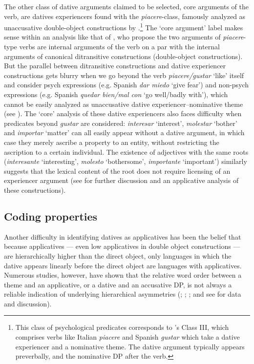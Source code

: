 \documentclass[output=paper,colorlinks,citecolor=brown,modfonts,nonflat]{langsci/langscibook}
\begin{document}
The other class of dative arguments claimed to be selected, core arguments of the verb, are datives experiencers found with the \textit{piacere}-class, famously analyzed as unaccusative double-object constructions by \citealt{BellettiRizzi1988}.\footnote{This class of psychological predicates corresponds to \citeauthor{BellettiRizzi1988}’s Class III, which comprises verbs like Italian \textit{piacere} and Spanish \textit{gustar} which take a dative experiencer and a nominative theme. The dative argument typically appears preverbally, and the nominative DP after the verb.}  The ‘core argument’ label makes sense within an analysis like that of \citeauthor{BellettiRizzi1988}, who propose the two arguments of \textit{piacere}-type verbs are internal arguments of the verb on a par with the internal arguments of canonical ditransitive constructions (double-object constructions).  But the parallel between ditransitive constructions and dative experiencer constructions gets blurry when we go beyond the verb \textit{piacere/gustar} ‘like’ itself and consider psych expressions (e.g. Spanish \textit{dar miedo} ‘give fear’) and non-psych expressions (e.g. Spanish \textit{quedar bien/mal con} ‘go well/badly with’), which cannot be easily analyzed as unaccusative dative experiencer–nominative theme (see \citealt{Cuervo2011}). The ‘core’ analysis of these dative experiencers also faces difficulty when predicates beyond \textit{gustar} are considered: \textit{interesar} ‘interest’, \textit{molestar} ‘bother’ and \textit{importar} ‘matter’ can all easily appear without a dative argument, in which case they merely ascribe a property to an entity, without restricting the ascription to a certain individual. The existence of adjectives with the same roots (\textit{interesante} ‘interesting’, \textit{molesto} ‘bothersome’, \textit{importante} ‘important’) similarly suggests that the lexical content of the root does not require licensing of an experiencer argument (see  for further discussion and an applicative analysis of these constructions).

\subsection{Coding properties}\label{sec:cuervo:2.2}

Another difficulty in identifying datives as applicatives has been the belief that because applicatives — even low applicatives in double object constructions — are hierarchically higher than the direct object, only languages in which the dative appears linearly before the direct object are languages with applicatives. Numerous studies, however, have shown that the relative word order between a theme and an applicative, or a dative and an accusative DP, is not always a reliable indication of underlying hierarchical asymmetries (; ; \citealt{Cuervo2003, Demonte1995, MiyagawaTsujioka2004}; and see \citealt{McGinnis2018} for data and discussion).
\end{document}
